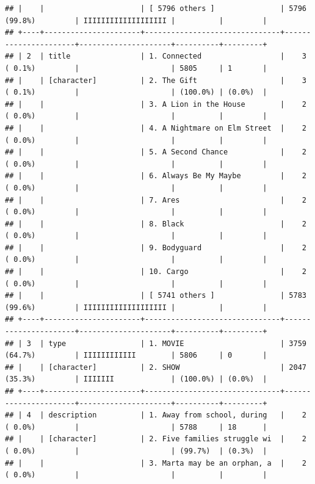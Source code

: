 \documentclass[11pt,preprint]{elsarticle}
\numberwithin{equation}{section}
\numberwithin{figure}{section}
\numberwithin{table}{section}
\begin{document}
\begin{verbatim}
## |    |                      | [ 5796 others ]               | 5796 (99.8%)         | IIIIIIIIIIIIIIIIIII |          |         |
## +----+----------------------+-------------------------------+----------------------+---------------------+----------+---------+
## | 2  | title                | 1. Connected                  |    3 ( 0.1%)         |                     | 5805     | 1       |
## |    | [character]          | 2. The Gift                   |    3 ( 0.1%)         |                     | (100.0%) | (0.0%)  |
## |    |                      | 3. A Lion in the House        |    2 ( 0.0%)         |                     |          |         |
## |    |                      | 4. A Nightmare on Elm Street  |    2 ( 0.0%)         |                     |          |         |
## |    |                      | 5. A Second Chance            |    2 ( 0.0%)         |                     |          |         |
## |    |                      | 6. Always Be My Maybe         |    2 ( 0.0%)         |                     |          |         |
## |    |                      | 7. Ares                       |    2 ( 0.0%)         |                     |          |         |
## |    |                      | 8. Black                      |    2 ( 0.0%)         |                     |          |         |
## |    |                      | 9. Bodyguard                  |    2 ( 0.0%)         |                     |          |         |
## |    |                      | 10. Cargo                     |    2 ( 0.0%)         |                     |          |         |
## |    |                      | [ 5741 others ]               | 5783 (99.6%)         | IIIIIIIIIIIIIIIIIII |          |         |
## +----+----------------------+-------------------------------+----------------------+---------------------+----------+---------+
## | 3  | type                 | 1. MOVIE                      | 3759 (64.7%)         | IIIIIIIIIIII        | 5806     | 0       |
## |    | [character]          | 2. SHOW                       | 2047 (35.3%)         | IIIIIII             | (100.0%) | (0.0%)  |
## +----+----------------------+-------------------------------+----------------------+---------------------+----------+---------+
## | 4  | description          | 1. Away from school, during   |    2 ( 0.0%)         |                     | 5788     | 18      |
## |    | [character]          | 2. Five families struggle wi  |    2 ( 0.0%)         |                     | (99.7%)  | (0.3%)  |
## |    |                      | 3. Marta may be an orphan, a  |    2 ( 0.0%)         |                     |          |         |

\end{verbatim}
\end{document}
